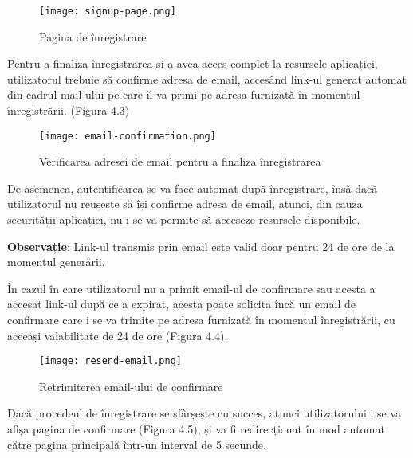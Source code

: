 \begin{figure}[H]
	\begin{center}
		\texttt{[image: signup-page.png]}
		\caption{Pagina de înregistrare}
	\end{center}
\end{figure}

Pentru a finaliza înregistrarea și a avea acces complet la resursele aplicației, utilizatorul trebuie să confirme adresa de email, accesând link-ul generat automat din cadrul mail-ului pe care îl va primi pe adresa furnizată în momentul înregistrării. (Figura 4.3)\newline 
\bigskip

\begin{figure}[H]
	\begin{center}
		\texttt{[image: email-confirmation.png]}
		\caption{Verificarea adresei de email pentru a finaliza înregistrarea}
	\end{center}
\end{figure}
\bigskip

De asemenea, autentificarea se va face automat după înregistrare, însă dacă utilizatorul nu reușește să își confirme adresa de email, atunci, din cauza securității aplicației, nu i se va permite să acceseze resursele disponibile.\newline

\textbf{Observație}: Link-ul transmis prin email este valid doar pentru 24 de ore de la momentul generării.\newline

În cazul în care utilizatorul nu a primit email-ul de confirmare sau acesta a accesat link-ul după ce a expirat, acesta poate solicita încă un email de confirmare care i se va trimite pe adresa furnizată în momentul înregistrării, cu aceeași valabilitate de 24 de ore (Figura 4.4).\newline
\bigskip

\begin{figure}[H]
	\begin{center}
		\texttt{[image: resend-email.png]}
		\caption{Retrimiterea email-ului de confirmare}
	\end{center}
\end{figure}
\bigskip

Dacă procedeul de înregistrare se sfârșește cu succes, atunci utilizatorului i se va afișa pagina de confirmare (Figura 4.5), și va fi redirecționat în mod automat către pagina principală într-un interval de 5 secunde.\newline

